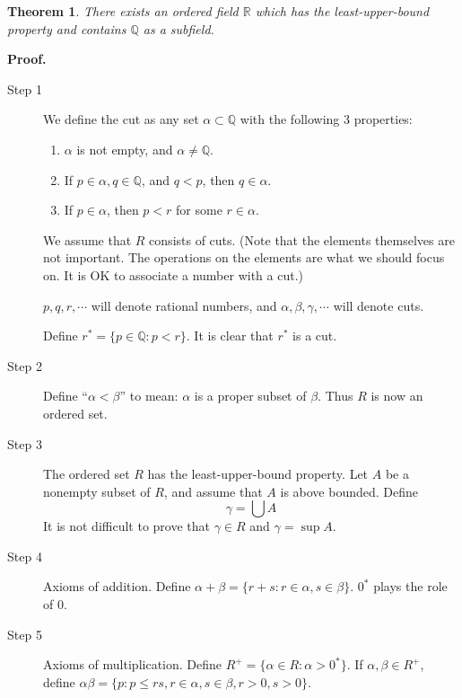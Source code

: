 \documentclass[aps,pra,onecolumn,notitlepage,superscriptaddress]{revtex4-1}
\newcommand{\R}{\mathbb{R}}
\newcommand{\Q}{\mathbb{Q}}
\newtheorem{theo}{Theorem}
\def\Proof{{\bf Proof.~}}
\begin{document}
    \begin{theo}
        There exists an ordered field $\R$ which has the least-upper-bound property and contains $\Q$ as a subfield.
    \end{theo}
    \begin{framed}
    \Proof{
        \begin{description}
            \item[Step 1] We define the cut as any set $\alpha \subset \Q$ with the following 3 properties:
            \begin{enumerate}
                \item $\alpha$ is not empty, and $\alpha \neq \Q$.
                \item If $p \in \alpha, q \in \Q$, and $q < p$, then $q \in \alpha$.
                \item If $p \in \alpha$, then $p < r$ for some $r \in \alpha$.
            \end{enumerate}
            
            We assume that $R$ consists of cuts. (Note that the elements themselves are not important. The operations on the elements are what we should focus on. It is OK to associate a number with a cut.)
            
            $p,q,r,\cdots$ will denote rational numbers, and $\alpha,\beta,\gamma,\cdots$ will denote cuts.

            Define $r^* = \{ p \in \Q : p < r \}$. It is clear that $r^*$ is a cut.
            
            \item[Step 2] Define ``$\alpha < \beta$'' to mean: $\alpha$ is a proper subset of $\beta$. Thus $R$ is now an ordered set.
            \item[Step 3] The ordered set $R$ has the least-upper-bound property. Let $A$ be a nonempty subset of $R$, and assume that $A$ is above bounded. Define
            \begin{equation}
                \gamma = \bigcup A
            \end{equation}
            It is not difficult to prove that $\gamma \in R$ and $\gamma = \sup A$.

            \item[Step 4] Axioms of addition. Define $\alpha + \beta = \{ r+s : r \in \alpha, s \in \beta \}$. $0^*$ plays the role of $0$.

            \item[Step 5] Axioms of multiplication. Define $R^+ = \{ \alpha \in R : \alpha > 0^* \}$. If $\alpha, \beta \in R^+$, define $\alpha \beta = \{ p : p \leq rs, r \in \alpha, s \in \beta, r > 0, s > 0 \}$.


\end{description}}
\end{framed}
\end{document}
